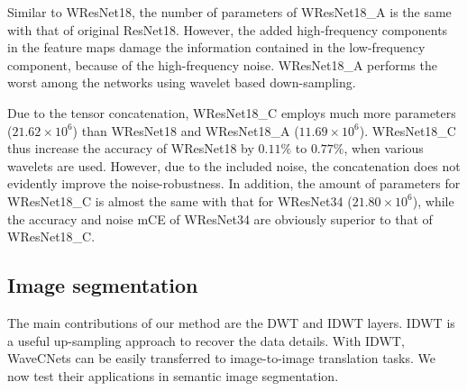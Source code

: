 \documentclass[10pt,twocolumn,letterpaper]{article}
\begin{document}
Similar to WResNet18, the number of parameters of WResNet18\_A is the same with that of original ResNet18.
However, the added high-frequency components in the feature maps damage the information contained in the low-frequency component,
because of the high-frequency noise.
WResNet18\_A performs the worst among the networks using wavelet based down-sampling.

Due to the tensor concatenation,
WResNet18\_C employs much more parameters ($21.62 \times 10^6$) than WResNet18 and WResNet18\_A ($11.69 \times 10^6$).
WResNet18\_C thus increase the accuracy of WResNet18 by $0.11\%$ to $0.77\%$, when various wavelets are used.
However, due to the included noise,
the concatenation does not evidently improve the noise-robustness.
In addition, the amount of parameters for WResNet18\_C is almost the same with that for WResNet34 ($21.80\times10^6$),
while the accuracy and noise mCE of WResNet34 are obviously superior to that of WResNet18\_C.


\subsection{Image segmentation}
The main contributions of our method are the DWT and IDWT layers.
IDWT is a useful up-sampling approach to recover the data details.
With IDWT, WaveCNets can be easily transferred to image-to-image translation tasks.
We now test their applications in semantic image segmentation.
\end{document}

